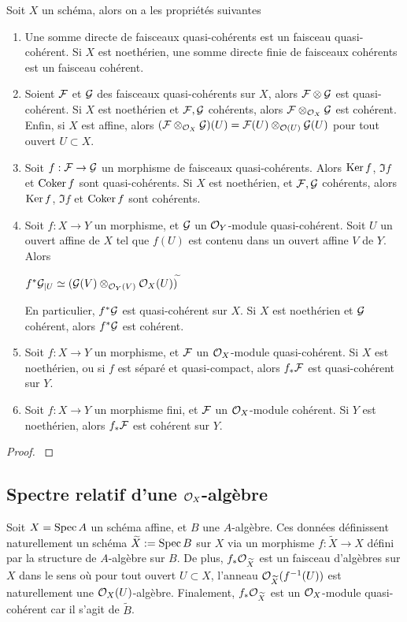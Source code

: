 \begin{prop}\label{FQCProps3}
Soit $X$ un schéma, alors on a les propriétés suivantes
\begin{enumerate}
\item Une somme directe de faisceaux quasi-cohérents est un faisceau quasi-cohérent. Si $X$ est noethérien, une somme directe finie de faisceaux cohérents est un faisceau cohérent.
\item Soient $\mathcal{F}$ et $\mathcal{G}$ des faisceaux quasi-cohérents sur $X$, alors $\mathcal{F}\otimes \mathcal{G}$ est quasi-cohérent. Si $X$ est noethérien et $\mathcal{F},\mathcal{G}$ cohérents, alors $\mathcal{F}\otimes_{\mathcal{O}_X} \mathcal{G}$ est cohérent. Enfin, si $X$ est affine, alors $(\mathcal{F}\otimes_{\mathcal{O}_X}\mathcal{G})(U)=\mathcal{F}(U)\otimes_{\mathcal{O}(U)}\mathcal{G}(U)$ pour tout ouvert $U\subset X$.
\item Soit $f:\mathcal{F}\rightarrow \mathcal{G}$ un morphisme de faisceaux quasi-cohérents. Alors $\operatorname{Ker} f$, $\Im f$ et $\operatorname{Coker} f$ sont quasi-cohérents. Si $X$ est noethérien, et $\mathcal{F}, \mathcal{G}$ cohérents, alors $\operatorname{Ker} f$, $\Im f$ et $\operatorname{Coker} f$ sont cohérents.
\item Soit $f:X\rightarrow Y$ un morphisme, et $\mathcal{G}$ un $\mathcal{O}_Y$-module quasi-cohérent. Soit $U$ un ouvert affine de $X$ tel que $f(U)$ est contenu dans un ouvert affine $V$ de $Y$. Alors
\begin{center}
$f^*\mathcal{G}_{|U}\simeq(\mathcal{G}(V)\otimes_{\mathcal{O}_Y(V)}\mathcal{O}_X(U))^{\widetilde{}}$
\end{center}
En particulier, $f^*\mathcal{G}$ est quasi-cohérent sur $X$. Si $X$ est noethérien et $\mathcal{G}$ cohérent, alors $f^*\mathcal{G}$ est cohérent.
\item Soit $f:X\rightarrow Y$ un morphisme, et $\mathcal{F}$ un $\mathcal{O}_X$-module quasi-cohérent. Si $X$ est noethérien, ou si $f$ est séparé et quasi-compact, alors $f_*\mathcal{F}$ est quasi-cohérent sur $Y$.
\item Soit $f:X\rightarrow Y$ un morphisme fini, et $\mathcal{F}$ un $\mathcal{O}_X$-module cohérent. Si $Y$ est noethérien, alors $f_*\mathcal{F}$ est cohérent sur $Y$.
\end{enumerate}
\end{prop}
\begin{proof}
\cite[5.1.14]{QingLiu}
\end{proof}

\subsection{Spectre relatif d'une $\mathcal{O}_X$-algèbre}

Soit $X=\operatorname{Spec} A$ un schéma affine, et $B$ une $A$-algèbre. Ces données définissent naturellement un schéma $\widetilde{X}:=\operatorname{Spec} B$ sur $X$ via un morphisme $f:\widetilde{X}\rightarrow X$ défini par la structure de $A$-algèbre sur $B$. De plus, $f_*\mathcal{O}_{\widetilde{X}}$ est un faisceau d'algèbres sur $X$ dans le sens où pour tout ouvert $U\subset X$, l'anneau $\mathcal{O}_{\widetilde{X}}(f^{-1}(U))$ est naturellement une $\mathcal{O}_X(U)$-algèbre. Finalement, $f_*\mathcal{O}_{\widetilde{X}}$ est un $\mathcal{O}_X$-module quasi-cohérent car il s'agit de $\widetilde{B}$.


